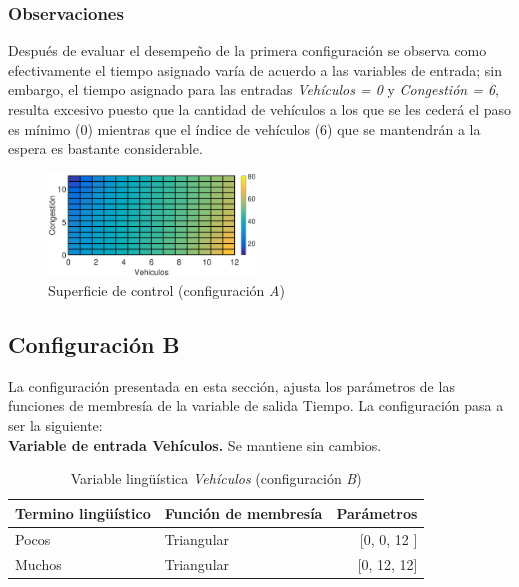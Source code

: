 \subsubsection{Observaciones}
\begin{multicols}{2}

Después de evaluar el desempeño de la primera configuración se observa como efectivamente el tiempo asignado varía de acuerdo a las variables de entrada; sin embargo, el tiempo asignado para las entradas \textit{Vehículos = 0} y \textit{Congestión = 6}, resulta excesivo puesto que la cantidad de vehículos a los que se les cederá el paso es mínimo (0) mientras que el índice de vehículos (6) que se mantendrán a la espera es bastante considerable.

\begin{figure}[H]
	\includegraphics[width=0.49\textwidth]{Surfaces/Surface2D_A.eps}
	\caption{Superficie de control (configuración \textit{A})}
\end{figure}

\end{multicols}

 


\pagebreak
\subsection{Configuración B}
La configuración presentada en esta sección, ajusta los parámetros de las funciones de membresía de la variable de salida Tiempo. La configuración pasa a ser la siguiente: \\

\textbf{Variable de entrada Vehículos.} Se mantiene sin cambios.\\

\begin{table}[!h]
	\centering
	\begin{tabular}{llr} \toprule
		Termino lingüístico & Función de membresía & Parámetros \\ \midrule
		Pocos & Triangular & [0, 0, 12 ] \\
		Muchos & Triangular & [0, 12, 12] \\ \bottomrule
	\end{tabular}
	\caption{Variable lingüística \textit{Vehículos} (configuración \textit{B})}
\end{table}



